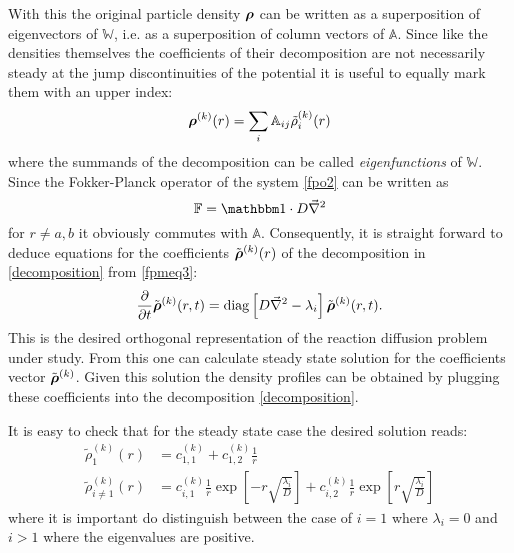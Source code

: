 With this the original particle density $\boldsymbol{\mathbf{\rho}}$ can be written as a superposition of eigenvectors of $\mathbb{W}$, i.e. as a superposition of column vectors of $\mathbb{A}$. Since like the densities themselves the coefficients of their decomposition are not necessarily steady at the jump discontinuities of the potential it is useful to equally mark them with an upper index:
\begin{equation}
    \boldsymbol{\mathbf{\rho}}^{(k)}(r) = \sum_i \mathbb{A}_{ij}\tilde{\rho}_{i}^{(k)}(r)
    \label{decomposition}
\end{equation}
where the summands of the decomposition can be called \emph{eigenfunctions} of $\mathbb{W}$. \\
Since the Fokker-Planck operator of the system \eqref{fpo2} can be written as 
\begin{equation}
    \mathbb{F} = \unity \cdot D \vec{\nabla}^{2}
    \label{fpunity}
\end{equation}
for $r \ne a, b$ it obviously commutes with $\mathbb{A}$. Consequently, it is straight forward to deduce equations for the coefficients $\tilde{\boldsymbol{\mathbf{\rho}}}^{(k)}(r)$ of the decomposition in \eqref{decomposition} from \eqref{fpmeq3}:
\begin{equation}
    \frac{\partial }{\partial t} \tilde{\boldsymbol{\mathbf{\rho}}}^{(k)}(r,t) = {\rm diag} \left[D \vec{\nabla}^{2} - \lambda_i  \right] \tilde{\boldsymbol{\mathbf{\rho}}}^{(k)}(r,t).
    \label{fpmeq4}
\end{equation}
This is the desired orthogonal representation of the reaction diffusion problem under study. From this one can calculate steady state solution for the coefficients vector $\tilde{\boldsymbol{\mathbf{\rho}}}^{(k)}$. Given this solution the density profiles can be obtained by plugging these coefficients into the decomposition \eqref{decomposition}.
\par
It is easy to check that for the steady state case the desired solution reads:
\begin{align}
    \tilde{\rho}_{1}^{(k)}(r) &= c_{1,1}^{(k)} + c_{1,2}^{(k)} \frac{1}{r} \nonumber \\
    \tilde{\rho}_{i \ne 1}^{(k)}(r) &= c_{i,1}^{(k)}\frac{1}{r} \exp\left[-r\sqrt{\frac{\lambda_i}{D}}\right] + c_{i,2}^{(k)}\frac{1}{r} \exp\left[r\sqrt{\frac{\lambda_i}{D}}\right] 
    \label{fp_ind_sol}
\end{align}
where it is important do distinguish between the case of $i=1$ where $\lambda_i = 0$ and $i>1$ where the eigenvalues are positive.\\

